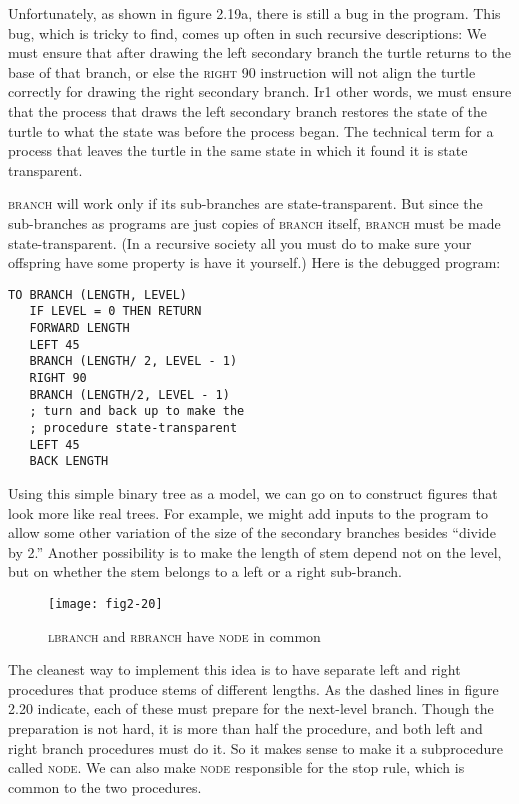 \documentclass{book}
\begin{document}
Unfortunately, as shown in figure 2.19a, there is still a bug in the program. This bug, which is tricky to find, comes up often in such recursive descriptions: We must ensure that after drawing the left secondary
branch the turtle returns to the base of that branch, or else the \textsc{right} 90
instruction will not align the turtle correctly for drawing the right secondary branch. Ir1 other words, we must ensure that the process that draws
the left secondary branch restores the state of the turtle to what the
state was before the process began. The technical term for a process
that leaves the turtle in the same state in which it found it is state transparent.

\textsc{branch} will work only if its sub-branches are state-transparent. But
since the sub-branches as programs are just copies of \textsc{branch} itself,
\textsc{branch} must be made state-transparent. (In a recursive society all you
must do to make sure your offspring have some property is have it
yourself.) Here is the debugged program:

\begin{verbatim}
TO BRANCH (LENGTH, LEVEL)
   IF LEVEL = 0 THEN RETURN
   FORWARD LENGTH
   LEFT 45
   BRANCH (LENGTH/ 2, LEVEL - 1)
   RIGHT 90
   BRANCH (LENGTH/2, LEVEL - 1)
   ; turn and back up to make the
   ; procedure state-transparent
   LEFT 45
   BACK LENGTH
\end{verbatim}
Using this simple binary tree as a model, we can go on to construct
figures that look more like real trees. For example, we might add inputs
to the program to allow some other variation of the size of the secondary
branches besides ``divide by 2.'' Another possibility is to make the length
of stem depend not on the level, but on whether the stem belongs to a
left or a right sub-branch.

\begin{figure}
\begin{center}
\texttt{[image: fig2-20]}
\caption{\textsc{lbranch} and \textsc{rbranch} have \textsc{node} in common}
\end{center}
\end{figure}

The cleanest way to implement this idea is to have separate left and
right procedures that produce stems of different lengths. As the dashed
lines in figure 2.20 indicate, each of these must prepare for the next-level
branch. Though the preparation is not hard, it is more than half the
procedure, and both left and right branch procedures must do it. So
it makes sense to make it a subprocedure called \textsc{node}. We can also
make \textsc{node} responsible for the stop rule, which is common to the two
procedures.
\end{document}
